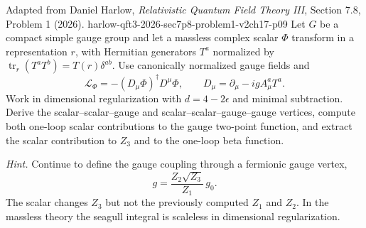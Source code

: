 \begin{enumerate}
  {Adapted from Daniel Harlow, \emph{Relativistic Quantum Field Theory III},
  Section 7.8, Problem 1 (2026).}
  {harlow-qft3-2026-sec7p8-problem1-v2ch17-p09}
  Let \(G\) be a compact simple gauge group and let a massless complex
  scalar \(\Phi\) transform in a representation \(r\), with Hermitian
  generators \(T^a\) normalized by
  \(\operatorname{tr}_r(T^aT^b)=T(r)\delta^{ab}\).  Use canonically
  normalized gauge fields and
  \[
    \mathcal L_\Phi=-(D_\mu\Phi)^\dagger D^\mu\Phi,\qquad
    D_\mu=\partial_\mu-igA_\mu^aT^a .
  \]
  Work in dimensional regularization with \(d=4-2\epsilon\) and minimal
  subtraction.  Derive the scalar--scalar--gauge and
  scalar--scalar--gauge--gauge vertices, compute both one-loop scalar
  contributions to the gauge two-point function, and extract the scalar
  contribution to \(Z_3\) and to the one-loop beta function.

  \emph{Hint.}  Continue to define the gauge coupling through a fermionic
  gauge vertex,
  \[
    g=\frac{Z_2\sqrt{Z_3}}{Z_1}\,g_0.
  \]
  The scalar changes \(Z_3\) but not the previously computed \(Z_1\) and
  \(Z_2\).  In the massless theory the seagull integral is scaleless in
  dimensional regularization.


\end{enumerate}
